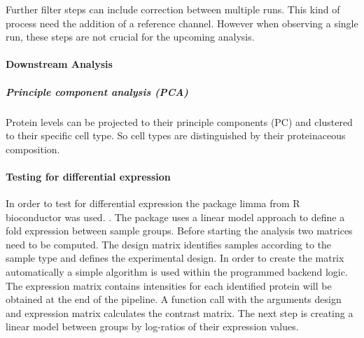 \documentclass[
]{article}
\begin{document}
Further filter steps can include correction between multiple runs. This
kind of process need the addition of a reference channel. However when
observing a single run, these steps are not crucial for the upcoming
analysis.

\hypertarget{downstream-analysis}{%
\paragraph{Downstream Analysis}\label{downstream-analysis}}

\hypertarget{principle-component-analysis-pca}{%
\subparagraph{Principle component analysis
(PCA)}\label{principle-component-analysis-pca}}

Protein levels can be projected to their principle components (PC) and
clustered to their specific cell type. So cell types are distinguished
by their proteinaceous composition.

\hypertarget{testing-for-differential-expression}{%
\paragraph{Testing for differential
expression}\label{testing-for-differential-expression}}

In order to test for differential expression the package limma from R
bioconductor was used. \citep{Phipson2016}. The package uses a linear
model approach to define a fold expression between sample groups. Before
starting the analysis two matrices need to be computed. The design
matrix identifies samples according to the sample type and defines the
experimental design. In order to create the matrix automatically a
simple algorithm is used within the programmed backend logic. The
expression matrix contains intensities for each identified protein will
be obtained at the end of the pipeline. A function call with the
arguments design and expression matrix calculates the contrast matrix.
The next step is creating a linear model between groups by log-ratios of
their expression values.
\end{document}
